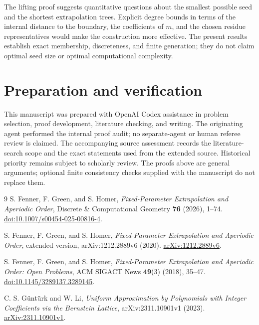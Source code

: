 \documentclass[11pt]{article}
\theoremstyle{remark}
\begin{document}
The lifting proof suggests quantitative questions about the smallest possible seed and the shortest extrapolation trees. Explicit degree bounds in terms of the internal distance to the boundary, the coefficients of $m$, and the chosen residue representatives would make the construction more effective. The present results establish exact membership, discreteness, and finite generation; they do not claim optimal seed size or optimal computational complexity.

\section*{Preparation and verification}
This manuscript was prepared with OpenAI Codex assistance in problem selection, proof development, literature checking, and writing. The originating agent performed the internal proof audit; no separate-agent or human referee review is claimed. The accompanying source assessment records the literature-search scope and the exact statements used from the extended source. Historical priority remains subject to scholarly review. The proofs above are general arguments; optional finite consistency checks supplied with the manuscript do not replace them.

\begin{thebibliography}{9}
S. Fenner, F. Green, and S. Homer,
\emph{Fixed-Parameter Extrapolation and Aperiodic Order},
Discrete \& Computational Geometry \textbf{76} (2026), 1--74.
\href{https://doi.org/10.1007/s00454-025-00816-4}{doi:10.1007/s00454-025-00816-4}.

S. Fenner, F. Green, and S. Homer,
\emph{Fixed-Parameter Extrapolation and Aperiodic Order},
extended version, arXiv:1212.2889v6 (2020).
\href{https://arxiv.org/abs/1212.2889v6}{arXiv:1212.2889v6}.

S. Fenner, F. Green, and S. Homer,
\emph{Fixed-Parameter Extrapolation and Aperiodic Order: Open Problems},
ACM SIGACT News \textbf{49}(3) (2018), 35--47.
\href{https://doi.org/10.1145/3289137.3289145}{doi:10.1145/3289137.3289145}.

C. S. G\"unt\"urk and W. Li,
\emph{Uniform Approximation by Polynomials with Integer Coefficients via the Bernstein Lattice},
arXiv:2311.10901v1 (2023).
\href{https://arxiv.org/abs/2311.10901v1}{arXiv:2311.10901v1}.
\end{thebibliography}
\end{document}
